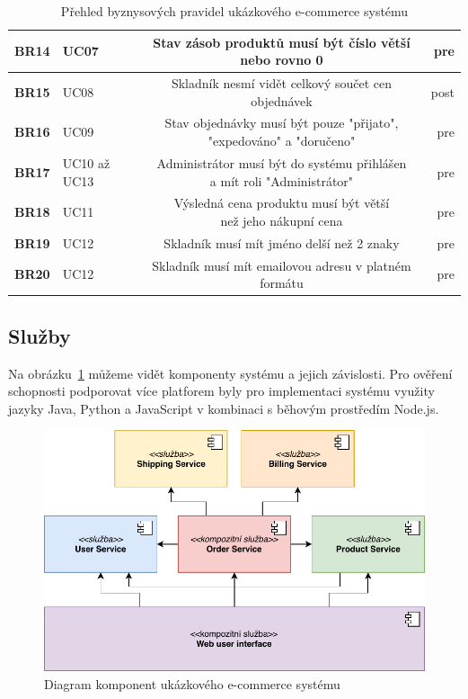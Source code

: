 \begin{table}
\begin{tabular}{ l l c r }
        \textbf{BR14} & UC07 & Stav zásob produktů musí být číslo větší nebo rovno 0 & pre \\ \hline
        \textbf{BR15} & UC08 & Skladník nesmí vidět celkový součet cen objednávek & post \\ \hline
        \textbf{BR16} & UC09 & \makecell[c]{Stav objednávky musí být pouze "přijato", \\ "expedováno" a "doručeno"} & pre \\ \hline
        \textbf{BR17} & UC10 až UC13 & \makecell[c]{Administrátor musí být do systému přihlášen \\ a mít roli "Administrátor"} & pre \\ \hline
        \textbf{BR18} & UC11 & \makecell[c]{Výsledná cena produktu musí být větší \\ než jeho nákupní cena} & pre \\ \hline
        \textbf{BR19} & UC12 & Skladník musí mít jméno delší než 2 znaky & pre \\ \hline
        \textbf{BR20} & UC12 & Skladník musí mít emailovou adresu v platném formátu & pre \\
        \hline
    \end{tabular}
    \caption{Přehled byznysových pravidel ukázkového e-commerce systému}
    \label{tbl:business-rules}
\end{table}

\subsection{Služby}

Na obrázku~\ref{fig:example-system} můžeme vidět komponenty systému a jejich závislosti.
Pro ověření schopnosti podporovat více platforem byly pro implementaci systému využity
jazyky Java, Python a JavaScript v kombinaci s běhovým prostředím Node.js.

\begin{figure}
    \centering
    \includegraphics[keepaspectratio=true, width=0.8\linewidth]{figures/example-system.pdf}
    \caption{Diagram komponent ukázkového e-commerce systému}
    \label{fig:example-system}
\end{figure}

